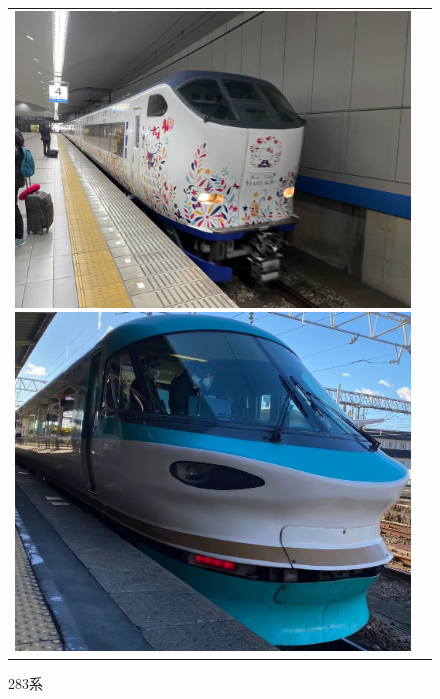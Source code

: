 \begin{figure}[htbp]
\begin{tabular}{cc}
		\begin{minipage}[b]{0.15\textwidth}
			\includegraphics[width=\linewidth]{densya/281.jpg}
			\caption{281系}
			\label{fig:281}
		\end{minipage}
	\begin{minipage}[b]{0.15\textwidth}
		\includegraphics[width=\linewidth]{densya/283.jpg}
		\caption{283系}
		\label{fig:283}
	\end{minipage}
		\begin{minipage}[b]{0.15\textwidth}

\end{minipage}
\end{tabular}
\end{figure}
